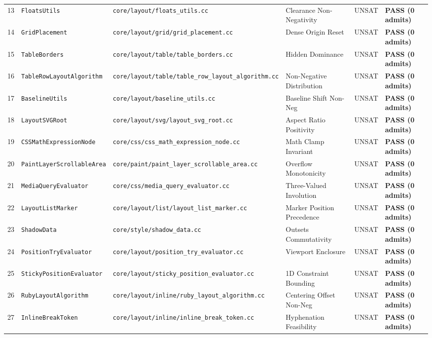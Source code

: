 \documentclass[10pt,journal,compsoc]{IEEEtran}
\begin{document}
\begin{table}[t]
\begin{tabular*}{\textwidth}{@{\extracolsep{\fill}}rlllll}
13 & \texttt{FloatsUtils} & \texttt{core/layout/floats\_utils.cc} & Clearance Non-Negativity & UNSAT & \textbf{PASS (0 admits)} \\
14 & \texttt{GridPlacement} & \texttt{core/layout/grid/grid\_placement.cc} & Dense Origin Reset & UNSAT & \textbf{PASS (0 admits)} \\
15 & \texttt{TableBorders} & \texttt{core/layout/table/table\_borders.cc} & Hidden Dominance & UNSAT & \textbf{PASS (0 admits)} \\
16 & \texttt{TableRowLayoutAlgorithm} & \texttt{core/layout/table/table\_row\_layout\_algorithm.cc} & Non-Negative Distribution & UNSAT & \textbf{PASS (0 admits)} \\
17 & \texttt{BaselineUtils} & \texttt{core/layout/baseline\_utils.cc} & Baseline Shift Non-Neg & UNSAT & \textbf{PASS (0 admits)} \\
18 & \texttt{LayoutSVGRoot} & \texttt{core/layout/svg/layout\_svg\_root.cc} & Aspect Ratio Positivity & UNSAT & \textbf{PASS (0 admits)} \\
19 & \texttt{CSSMathExpressionNode} & \texttt{core/css/css\_math\_expression\_node.cc} & Math Clamp Invariant & UNSAT & \textbf{PASS (0 admits)} \\
20 & \texttt{PaintLayerScrollableArea}& \texttt{core/paint/paint\_layer\_scrollable\_area.cc} & Overflow Monotonicity & UNSAT & \textbf{PASS (0 admits)} \\
21 & \texttt{MediaQueryEvaluator} & \texttt{core/css/media\_query\_evaluator.cc} & Three-Valued Involution & UNSAT & \textbf{PASS (0 admits)} \\
22 & \texttt{LayoutListMarker} & \texttt{core/layout/list/layout\_list\_marker.cc} & Marker Position Precedence & UNSAT & \textbf{PASS (0 admits)} \\
23 & \texttt{ShadowData} & \texttt{core/style/shadow\_data.cc} & Outsets Commutativity & UNSAT & \textbf{PASS (0 admits)} \\
24 & \texttt{PositionTryEvaluator} & \texttt{core/layout/position\_try\_evaluator.cc} & Viewport Enclosure & UNSAT & \textbf{PASS (0 admits)} \\
25 & \texttt{StickyPositionEvaluator}& \texttt{core/layout/sticky\_position\_evaluator.cc} & 1D Constraint Bounding & UNSAT & \textbf{PASS (0 admits)} \\
26 & \texttt{RubyLayoutAlgorithm} & \texttt{core/layout/inline/ruby\_layout\_algorithm.cc} & Centering Offset Non-Neg & UNSAT & \textbf{PASS (0 admits)} \\
27 & \texttt{InlineBreakToken} & \texttt{core/layout/inline/inline\_break\_token.cc} & Hyphenation Feasibility & UNSAT & \textbf{PASS (0 admits)} \\

\end{tabular*}
\end{table}
\end{document}
